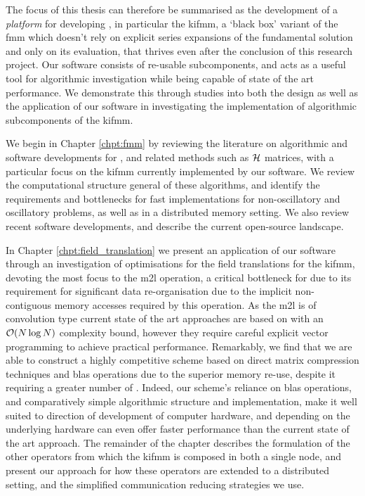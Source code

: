 The focus of this thesis can therefore be summarised as the development of a \textit{platform} for developing , in particular the \acrfull{kifmm}, a `black box' variant of the \acrshort{fmm} which doesn't rely on explicit series expansions of the fundamental solution and only on its evaluation, that thrives even after the conclusion of this research project. Our software consists of re-usable subcomponents, and acts as a useful tool for algorithmic investigation while being capable of state of the art performance. We demonstrate this through studies into both the design as well as the application of our software in investigating the implementation of algorithmic subcomponents of the \acrshort{kifmm}.

We begin in Chapter \ref{chpt:fmm} by reviewing the literature on algorithmic and software developments for , and related methods such as $\mathcal{H}$ matrices, with a particular focus on the \acrshort{kifmm} currently implemented by our software. We review the computational structure general of these algorithms, and identify the requirements and bottlenecks for fast implementations for non-oscillatory and oscillatory problems, as well as in a distributed memory setting. We also review recent software developments, and describe the current open-source landscape.

In Chapter \ref{chpt:field_translation} we present an application of our software through an investigation of optimisations for the field translations for the \acrshort{kifmm}, devoting the most focus to the \acrfull{m2l} operation, a critical bottleneck for  due to its requirement for significant data re-organisation due to the implicit non-contiguous memory accesses required by this operation. As the \acrshort{m2l} is of convolution type current state of the art approaches are based on  with an $\mathcal{O}(N \log{N})$ complexity bound, however they require careful explicit vector programming to achieve practical performance. Remarkably, we find that we are able to construct a highly competitive scheme based on direct matrix compression techniques and \acrfull{blas} operations due to the superior memory re-use, despite it requiring a greater number of . Indeed, our scheme's reliance on \acrshort{blas} operations, and comparatively simple algorithmic structure and implementation, make it well suited to direction of development of computer hardware, and depending on the underlying hardware can even offer faster performance than the current state of the art approach. The remainder of the chapter describes the formulation of the other operators from which the \acrshort{kifmm} is composed in both a single node, and present our approach for how these operators are extended to a distributed setting, and the simplified communication reducing strategies we use.

